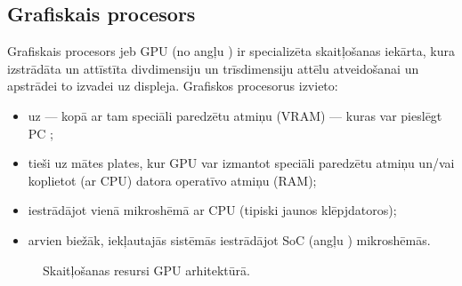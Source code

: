 \subsection{Grafiskais procesors} \label{sec:gpu}
Grafiskais procesors jeb GPU (no angļu )
ir specializēta skaitļošanas iekārta, kura izstrādāta
un attīstīta divdimensiju un trīsdimensiju attēlu atveidošanai un apstrādei
to izvadei uz displeja.
Grafiskos procesorus izvieto:
\begin{itemize}
	\item uz  --- kopā ar tam speciāli paredzētu
		atmiņu (VRAM) --- kuras var pieslēgt PC ;
	\item tieši uz mātes plates, kur GPU var izmantot speciāli paredzētu
		atmiņu un/vai koplietot (ar CPU) datora operatīvo atmiņu (RAM);
	\item iestrādājot vienā mikroshēmā ar CPU (tipiski jaunos klēpjdatoros);
	\item arvien biežāk, iekļautajās sistēmās iestrādājot SoC
		(angļu ) mikroshēmās.
\end{itemize}

\begin{figure}[tbh]
	\centering
	\def\svgscale{1.2}
	{}
	\caption{Skaitļošanas resursi GPU arhitektūrā.}
	\label{fig:gpu-arch}
\end{figure}
